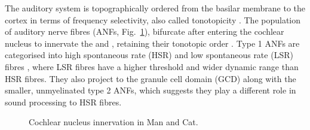 The auditory system is topographically ordered from the basilar membrane to the
cortex in terms of frequency selectivity, also called tonotopicity
\citep{YoungOertel:2004}.  The population of auditory nerve fibres (ANFs,
Fig.~\ref{fig:CNdiagram}), bifurcate after entering the cochlear nucleus to
innervate the \VCN and \DCN\@, retaining their tonotopic order
\citep{Lorente:1981, Liberman:1982, Liberman:1993}. Type 1 ANFs are categorised
into high spontaneous rate (HSR) and low spontaneous rate (LSR) fibres
\citep{Liberman:1978}, where LSR fibres have a higher threshold and wider
dynamic range than HSR fibres. They also project to the granule cell domain
(GCD) \citep{RyugoParks:2003, RyugoHaenggeliEtAl:2003} along with the smaller,
unmyelinated type 2 ANFs, which suggests they play a different role in sound
processing to HSR fibres.


\begin{figure}[tbh]
  \begin{center}
    \caption{Cochlear nucleus innervation in Man and Cat. \citep[!find out which publication printed this!]{RyugoParks:2003,Ryugo:1992,Spoendlin:1973}}
    \label{fig:CNdiagram}
  \end{center}
\end{figure}






%

